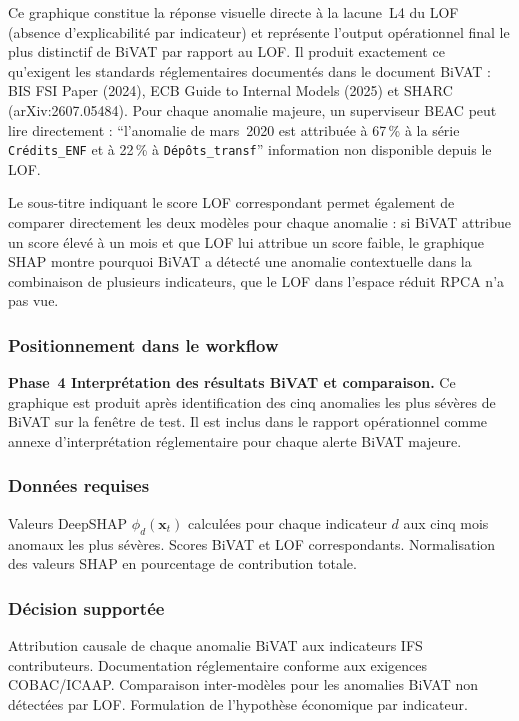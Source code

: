 \documentclass[12pt,a4paper]{article}
\begin{document}
Ce graphique constitue la réponse visuelle directe à la lacune~L4 du LOF
(absence d'explicabilité par indicateur) et représente l'output opérationnel
final le plus distinctif de BiVAT par rapport au LOF. Il produit exactement
ce qu'exigent les standards réglementaires documentés dans le document BiVAT :
BIS FSI Paper (2024), ECB Guide to Internal Models (2025) et SHARC
(arXiv:2607.05484). Pour chaque anomalie majeure, un superviseur BEAC peut
lire directement : ``l'anomalie de mars~2020 est attribuée à 67\,\% à la
série \texttt{Crédits\_ENF} et à 22\,\% à \texttt{Dépôts\_transf}'' 
information non disponible depuis le LOF.

Le sous-titre indiquant le score LOF correspondant permet également de
comparer directement les deux modèles pour chaque anomalie : si BiVAT
attribue un score élevé à un mois et que LOF lui attribue un score faible,
le graphique SHAP montre pourquoi  BiVAT a détecté une anomalie
contextuelle dans la combinaison de plusieurs indicateurs, que le LOF
dans l'espace réduit RPCA n'a pas vue.

\subsubsection{Positionnement dans le workflow}

\textbf{Phase~4  Interprétation des résultats BiVAT et comparaison.}
Ce graphique est produit après identification des cinq anomalies les plus
sévères de BiVAT sur la fenêtre de test. Il est inclus dans le rapport
opérationnel comme annexe d'interprétation réglementaire pour chaque
alerte BiVAT majeure.

\subsubsection{Données requises}

Valeurs DeepSHAP $\phi_d(\mathbf{x}_t)$ calculées pour chaque indicateur
$d$ aux cinq mois anomaux les plus sévères. Scores BiVAT et LOF
correspondants. Normalisation des valeurs SHAP en pourcentage de contribution
totale.

\subsubsection{Décision supportée}

Attribution causale de chaque anomalie BiVAT aux indicateurs IFS
contributeurs. Documentation réglementaire conforme aux exigences
COBAC/ICAAP. Comparaison inter-modèles pour les anomalies BiVAT non
détectées par LOF. Formulation de l'hypothèse économique par indicateur.
\end{document}
